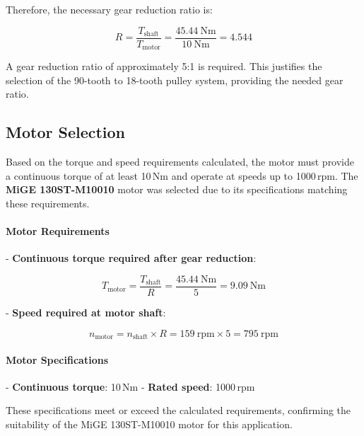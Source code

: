 Therefore, the necessary gear reduction ratio is:

\[
R = \frac{T_{\text{shaft}}}{T_{\text{motor}}} = \frac{45.44\ \text{Nm}}{10\ \text{Nm}} = 4.544
\]

A gear reduction ratio of approximately 5:1 is required. This justifies the selection of the 90-tooth to 18-tooth pulley system, providing the needed gear ratio.

\subsection*{Motor Selection}

Based on the torque and speed requirements calculated, the motor must provide a continuous torque of at least 10\,Nm and operate at speeds up to 1000\,rpm. The \textbf{MiGE 130ST-M10010} motor was selected due to its specifications matching these requirements.

\paragraph{Motor Requirements}

- \textbf{Continuous torque required after gear reduction}:

\[
T_{\text{motor}} = \frac{T_{\text{shaft}}}{R} = \frac{45.44\ \text{Nm}}{5} = 9.09\ \text{Nm}
\]

- \textbf{Speed required at motor shaft}:

\[
n_{\text{motor}} = n_{\text{shaft}} \times R = 159\ \text{rpm} \times 5 = 795\ \text{rpm}
\]

\paragraph{Motor Specifications}

- \textbf{Continuous torque}: 10\,Nm
- \textbf{Rated speed}: 1000\,rpm

These specifications meet or exceed the calculated requirements, confirming the suitability of the MiGE 130ST-M10010 motor for this application.

